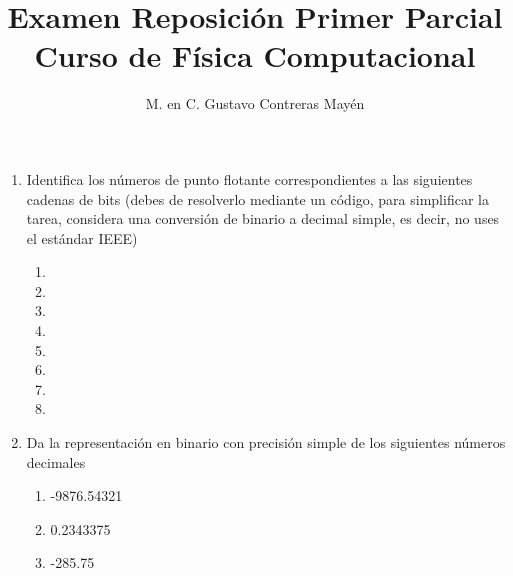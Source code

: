 \documentclass[11pt]{article}
\title{Examen Reposición Primer Parcial \\ Curso de Física Computacional}
\author{M. en C. Gustavo Contreras Mayén}
\date{ }
\begin{document}
\maketitle
\fontsize{14}{14}\selectfont
\begin{enumerate}
\item Identifica los números de punto flotante correspondientes a las siguientes cadenas de bits (debes de resolverlo mediante un código, para simplificar la tarea, considera una conversión de binario a decimal simple, es decir, no uses el estándar IEEE)
\begin{enumerate}
\item {}
\item {}
\item {}
\item {}
\item {}
\item {}
\item {}
\item {}
\end{enumerate}
\item Da la representación en binario con precisión simple de los siguientes números decimales
\begin{enumerate}
\item -9876.54321
\item 0.2343375
\item -285.75

\end{enumerate}
\end{enumerate}
\end{document}
